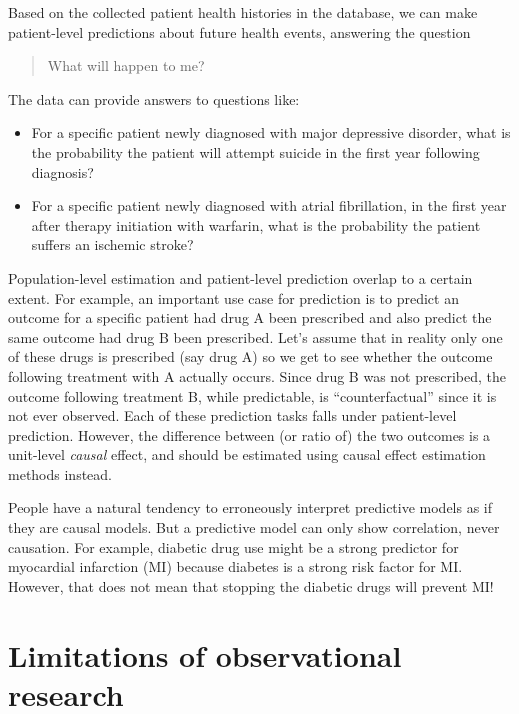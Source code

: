 \documentclass[11pt]{book}
\providecommand{\tightlist}{%
  \setlength{\itemsep}{0pt}\setlength{\parskip}{0pt}}
\let\BeginKnitrBlock\begin \let\EndKnitrBlock\end
\begin{document}
Based on the collected patient health histories in the database, we can
make patient-level predictions about future health events, answering the
question

\begin{quote}
What will happen to me?
\end{quote}

The data can provide answers to questions like:

\begin{itemize}
\tightlist
\item
  For a specific patient newly diagnosed with major depressive disorder,
  what is the probability the patient will attempt suicide in the first
  year following diagnosis?
\item
  For a specific patient newly diagnosed with atrial fibrillation, in
  the first year after therapy initiation with warfarin, what is the
  probability the patient suffers an ischemic stroke?
\end{itemize}

Population-level estimation and patient-level prediction overlap to a
certain extent. For example, an important use case for prediction is to
predict an outcome for a specific patient had drug A been prescribed and
also predict the same outcome had drug B been prescribed. Let's assume
that in reality only one of these drugs is prescribed (say drug A) so we
get to see whether the outcome following treatment with A actually
occurs. Since drug B was not prescribed, the outcome following treatment
B, while predictable, is ``counterfactual'' since it is not ever
observed. Each of these prediction tasks falls under patient-level
prediction. However, the difference between (or ratio of) the two
outcomes is a unit-level \emph{causal} effect, and should be estimated
using causal effect estimation methods instead.

\BeginKnitrBlock{rmdimportant}
People have a natural tendency to erroneously interpret predictive
models as if they are causal models. But a predictive model can only
show correlation, never causation. For example, diabetic drug use might
be a strong predictor for myocardial infarction (MI) because diabetes is
a strong risk factor for MI. However, that does not mean that stopping
the diabetic drugs will prevent MI!
\EndKnitrBlock{rmdimportant}

\section{Limitations of observational
research}\label{limitations-of-observational-research}
\end{document}
